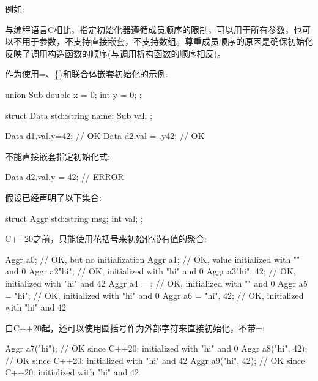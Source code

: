 例如:


与编程语言C相比，指定初始化器遵循成员顺序的限制，可以用于所有参数，也可以不用于参数，不支持直接嵌套，不支持数组。尊重成员顺序的原因是确保初始化反映了调用构造函数的顺序(与调用析构函数的顺序相反)。

作为使用=、\{\}和联合体嵌套初始化的示例:

\begin{cpp}
union Sub {
	double x = 0;
	int y = 0;
};

struct Data {
	std::string name;
	Sub val;
};

Data d1{.val{.y=42}}; // OK
Data d2{.val = {.y{42}}}; // OK
\end{cpp}

不能直接嵌套指定初始化式:

\begin{cpp}
Data d2{.val.y = 42}; // ERROR
\end{cpp}


假设已经声明了以下集合:

\begin{cpp}
struct Aggr {
	std::string msg;
	int val;
};
\end{cpp}

C++20之前，只能使用花括号来初始化带有值的聚合:

\begin{cpp}
Aggr a0; // OK, but no initialization
Aggr a1{}; // OK, value initialized with "" and 0
Aggr a2{"hi"}; // OK, initialized with "hi" and 0
Aggr a3{"hi", 42}; // OK, initialized with "hi" and 42
Aggr a4 = {}; // OK, initialized with "" and 0
Aggr a5 = {"hi"}; // OK, initialized with "hi" and 0
Aggr a6 = {"hi", 42}; // OK, initialized with "hi" and 42
\end{cpp}

自C++20起，还可以使用圆括号作为外部字符来直接初始化，不带=:

\begin{cpp}
Aggr a7("hi"); // OK since C++20: initialized with "hi" and 0
Aggr a8("hi", 42); // OK since C++20: initialized with "hi" and 42
Aggr a9({"hi", 42}); // OK since C++20: initialized with "hi" and 42
\end{cpp}

